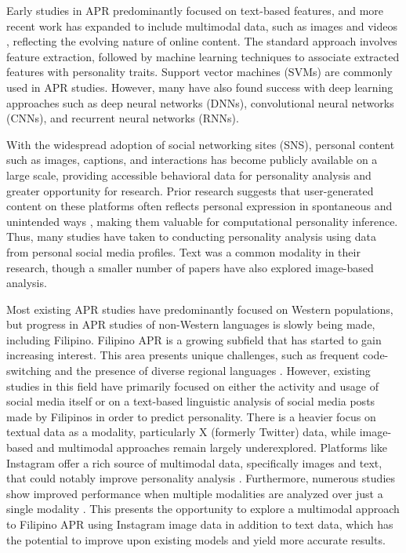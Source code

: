 Early studies in APR predominantly focused on text-based features, and more recent work has expanded to include multimodal data, such as images and videos \citep{Mehta2020}, reflecting the evolving nature of online content. The standard approach involves feature extraction, followed by machine learning techniques to associate extracted features with personality traits. Support vector machines (SVMs) are commonly used in APR studies. However, many have also found success with deep learning approaches \citep{Zhao2022} such as deep neural networks (DNNs), convolutional neural networks (CNNs), and recurrent neural networks (RNNs).

With the widespread adoption of social networking sites (SNS), personal content such as images, captions, and interactions has become publicly available on a large scale, providing accessible behavioral data for personality analysis and greater opportunity for research. Prior research suggests that user-generated content on these platforms often reflects personal expression in spontaneous and unintended ways \citep{Vinciarelli2014}, making them valuable for computational personality inference. Thus, many studies have taken to conducting personality analysis using data from personal social media profiles. Text was a common modality in their research, though a smaller number of papers have also explored image-based analysis. 

Most existing APR studies have predominantly focused on Western populations, but progress in APR studies of non-Western languages is slowly being made, including Filipino. Filipino APR is a growing subfield that has started to gain increasing interest. This area presents unique challenges, such as frequent code-switching and the presence of diverse regional languages \citep{tighe_acorda_2022}. However, existing studies in this field have primarily focused on either the activity and usage of social media itself or on a text-based linguistic analysis of social media posts made by Filipinos in order to predict personality. There is a heavier focus on textual data as a modality, particularly X (formerly Twitter) data, while image-based and multimodal approaches remain largely underexplored. Platforms like Instagram offer a rich source of multimodal data, specifically images and text, that could notably improve personality analysis \citep{Skowron2016}. Furthermore, numerous studies show improved performance when multiple modalities are analyzed over just a single modality \citep{batrinca_multimodal_2016, lima_sequential_2022}. This presents the opportunity to explore a multimodal approach to Filipino APR using Instagram image data in addition to text data, which has the potential to improve upon existing models and yield more accurate results.

